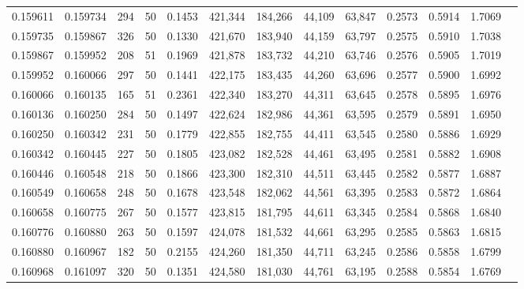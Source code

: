 \begin{tabular}{rrrrrrrrrrrrr}
0.159611 & 0.159734 &   294 &  50 &                                     0.1453 & 421,344 & 184,266 &  44,109 &  63,847 & 0.2573 & 0.5914 & 1.7069 \\
0.159735 & 0.159867 &   326 &  50 &                                     0.1330 & 421,670 & 183,940 &  44,159 &  63,797 & 0.2575 & 0.5910 & 1.7038 \\
0.159867 & 0.159952 &   208 &  51 &                                     0.1969 & 421,878 & 183,732 &  44,210 &  63,746 & 0.2576 & 0.5905 & 1.7019 \\
0.159952 & 0.160066 &   297 &  50 &                                     0.1441 & 422,175 & 183,435 &  44,260 &  63,696 & 0.2577 & 0.5900 & 1.6992 \\
0.160066 & 0.160135 &   165 &  51 &                                     0.2361 & 422,340 & 183,270 &  44,311 &  63,645 & 0.2578 & 0.5895 & 1.6976 \\
0.160136 & 0.160250 &   284 &  50 &                                     0.1497 & 422,624 & 182,986 &  44,361 &  63,595 & 0.2579 & 0.5891 & 1.6950 \\
0.160250 & 0.160342 &   231 &  50 &                                     0.1779 & 422,855 & 182,755 &  44,411 &  63,545 & 0.2580 & 0.5886 & 1.6929 \\
0.160342 & 0.160445 &   227 &  50 &                                     0.1805 & 423,082 & 182,528 &  44,461 &  63,495 & 0.2581 & 0.5882 & 1.6908 \\
0.160446 & 0.160548 &   218 &  50 &                                     0.1866 & 423,300 & 182,310 &  44,511 &  63,445 & 0.2582 & 0.5877 & 1.6887 \\
0.160549 & 0.160658 &   248 &  50 &                                     0.1678 & 423,548 & 182,062 &  44,561 &  63,395 & 0.2583 & 0.5872 & 1.6864 \\
0.160658 & 0.160775 &   267 &  50 &                                     0.1577 & 423,815 & 181,795 &  44,611 &  63,345 & 0.2584 & 0.5868 & 1.6840 \\
0.160776 & 0.160880 &   263 &  50 &                                     0.1597 & 424,078 & 181,532 &  44,661 &  63,295 & 0.2585 & 0.5863 & 1.6815 \\
0.160880 & 0.160967 &   182 &  50 &                                     0.2155 & 424,260 & 181,350 &  44,711 &  63,245 & 0.2586 & 0.5858 & 1.6799 \\
0.160968 & 0.161097 &   320 &  50 &                                     0.1351 & 424,580 & 181,030 &  44,761 &  63,195 & 0.2588 & 0.5854 & 1.6769 \\

\end{tabular}
